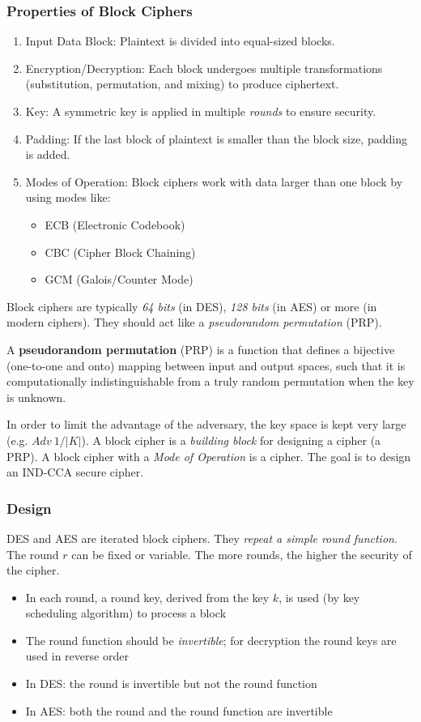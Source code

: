 \subsubsection{Properties of Block Ciphers}
\begin{enumerate}
    \item Input Data Block: Plaintext is divided into equal-sized blocks.
    \item Encryption/Decryption: Each block undergoes multiple transformations (substitution, permutation, and mixing) to produce ciphertext.
    \item Key: A symmetric key is applied in multiple \emph{rounds} to ensure security.
    \item Padding: If the last block of plaintext is smaller than the block size, padding is added.
    \item Modes of Operation: Block ciphers work with data larger than one block by using modes like:
    \begin{itemize}
        \item ECB (Electronic Codebook)
        \item CBC (Cipher Block Chaining)
        \item GCM (Galois/Counter Mode)
    \end{itemize}
\end{enumerate}
Block ciphers are typically \emph{64 bits} (in DES), \emph{128 bits} (in AES) or more (in modern ciphers). They should act like a \emph{pseudorandom permutation} (PRP).

\begin{defn}
A \textbf{pseudorandom permutation} (PRP) is a function that defines a bijective (one-to-one and onto) mapping between input and output spaces, such that it is computationally indistinguishable from a truly random permutation when the key is unknown. 
\end{defn}

In order to limit the advantage of the adversary, the key space is kept very large (e.g. $Adv \ 1/|K|$). A block cipher is a \emph{building block} for designing a cipher (a PRP). A block cipher with a \emph{Mode of Operation} is a cipher. The goal is to design an IND-CCA secure cipher.

\subsubsection{Design}
DES and AES are iterated block ciphers. They \emph{repeat a simple round function}. The round $r$ can be fixed or variable. The more rounds, the higher the security of the cipher.
\begin{itemize}
    \item In each round, a round key, derived from the key $k$, is used (by key scheduling algorithm) to process a block
    \item The round function should be \emph{invertible}; for decryption the round keys are used in reverse order
    \item In DES: the round is invertible but not the round function
    \item In AES: both the round and the round function are invertible
\end{itemize}

